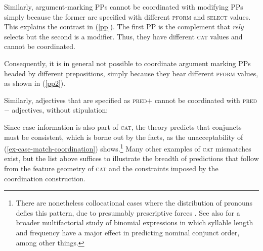 {Similarly, argument-marking PPs cannot be coordinated with modifying PPs simply because the former are specified with different  \textsc{pform} and \textsc{select} values. This explains the contrast
in (\ref{pp}). The first PP is the complement that \emph{rely}
selects but the second is a modifier. Thus, they have different \textsc{cat} values 
and cannot be coordinated.


\eal
\label{pp}
\zl

\noindent
Consequently, it is in general not possible to coordinate argument marking PPs headed by different prepositions, simply because they bear
different \textsc{pform} values, as shown in (\ref{pp2}).

\eal
\label{pp2}

\zl

Similarly, adjectives that are specified as \textsc{pred}$+$ cannot be
coordinated with  \textsc{pred}$-$ adjectives, without stipulation:

\eal
{}
\zl


\noindent
Since case information is also part of \textsc{cat},  the theory
predicts that conjuncts must be consistent, which is borne out by the
facts, as the unacceptability of  (\ref{ex-case-match-coordination}) shows.\footnote{There are nonetheless collocational cases where the distribution of pronouns defies this pattern, due to presumably prescriptive forces \citep{grano}. See also \citet[105, 107]{binomial} for a broader multifactorial study of binomial expressions in which syllable length and  frequency have a major effect in predicting nominal conjunct order, among other things.}
 Many other examples of \textsc{cat} mismatches exist, but the  list above suffices to
illustrate the breadth of predictions that follow from the feature geometry of \textsc{cat} and the constraints imposed by
the coordination construction.

\eal
\label{ex-case-match-coordination}
\zl


}

